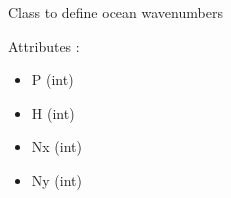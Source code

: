 \documentclass[letterpaper,10pt,english]{sphinxmanual}
\begin{document}

\begin{fulllineitems}
\label{rstfiles/inprod_analytic:inprod_analytic.ocean_wavenum}
Class to define ocean wavenumbers

Attributes :
\begin{itemize}
\item {} 
P (int)

\item {} 
H (int)

\item {} 
Nx (int)

\item {} 
Ny (int)

\end{itemize}

\end{fulllineitems}

\end{document}
